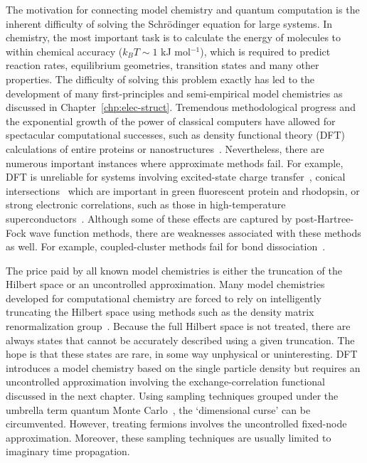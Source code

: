 \documentclass[11pt,oneside,final]{huthesis}%
\begin{document}
The motivation for connecting model chemistry  and quantum computation is the inherent difficulty of solving the Schr\"odinger equation for
large systems. In chemistry, the most important task is to calculate the energy of
molecules to within chemical accuracy ($k_B T \sim 1$ kJ mol$^{-1}$), which is
required to predict reaction rates, equilibrium geometries, transition states and many other properties.
The difficulty of solving this
problem exactly has led to the development of many first-principles and semi-empirical model chemistries as discussed in Chapter~\ref{chp:elec-struct}. 
Tremendous methodological progress and the exponential growth of the power of classical
computers have allowed for spectacular computational successes,
such as density functional theory (DFT) calculations of entire proteins
or nanostructures~\cite{Hung09,Chelikowsky09}. Nevertheless, there are numerous
important instances where approximate methods fail. For example, DFT is
unreliable for systems involving excited-state charge transfer~\cite{Dreuw04}, conical intersections~\cite{Levine07} which are
important in green fluorescent protein and rhodopsin, or strong
electronic correlations, such as those in high-temperature
superconductors~\cite{Lee06}. Although some of these effects are
captured by post-Hartree-Fock wave function methods, there are
weaknesses associated with these methods as well. For example,
coupled-cluster methods fail for bond dissociation~\cite{Voorhis00}.
 
The price paid by all known model chemistries is either the truncation of the Hilbert space or an uncontrolled approximation. Many model chemistries developed for computational chemistry are forced to rely on intelligently truncating the Hilbert space using methods such as the density matrix renormalization group~\cite{Chan08}. Because the full Hilbert space is not treated, there are always states that cannot be accurately described using a given truncation.  The hope is that these states are rare, in some way unphysical or uninteresting. DFT introduces a model chemistry based on the single particle density but requires an uncontrolled approximation involving the exchange-correlation functional discussed in the next chapter.  Using sampling techniques grouped under the umbrella term quantum Monte Carlo~\cite{Lester09}, the `dimensional curse' can be circumvented. However, treating fermions involves the uncontrolled fixed-node approximation.  Moreover, these sampling techniques are usually limited to imaginary time propagation.  
\end{document}
